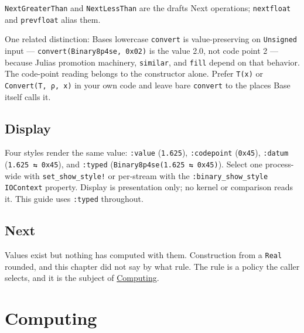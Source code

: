 \texttt{NextGreaterThan} and \texttt{NextLessThan} are the draft{\textquotesingle}s Next operations; \texttt{nextfloat} and \texttt{prevfloat} alias them.



One related distinction: Base{\textquotesingle}s lowercase \texttt{convert} is value-preserving on \texttt{Unsigned} input — \texttt{convert(\allowbreak{}Binary8p4se, 0x02)} is the value 2.0, not code point 2 — because Julia{\textquotesingle}s promotion machinery, \texttt{similar}, and \texttt{fill} depend on that behavior. The code-point reading belongs to the constructor alone. Prefer \texttt{T(x)} or \texttt{Convert(T, ρ, x)} in your own code and leave bare \texttt{convert} to the places Base itself calls it.



\section{Display}



\label{12429740135947470305}{}


Four styles render the same value: \texttt{:value} (\texttt{1.625}), \texttt{:codepoint} (\texttt{0x45}), \texttt{:datum} (\texttt{1.625 ⇆ 0x45}), and \texttt{:typed} (\texttt{Binary8p4se(\allowbreak{}1.625 ⇆ 0x45)}). Select one process-wide with \texttt{set\_\allowbreak{}show\_\allowbreak{}style!} or per-stream with the \texttt{:binary\_\allowbreak{}show\_\allowbreak{}style} \texttt{IOContext} property. Display is presentation only; no kernel or comparison reads it. This guide uses \texttt{:typed} throughout.



\section{Next}



\label{9862256287407127426}{}


Values exist but nothing has computed with them. Construction from a \texttt{Real} rounded, and this chapter did not say by what rule. The rule is a policy the caller selects, and it is the subject of \href{computing.md}{Computing}.





\chapter{Computing}



